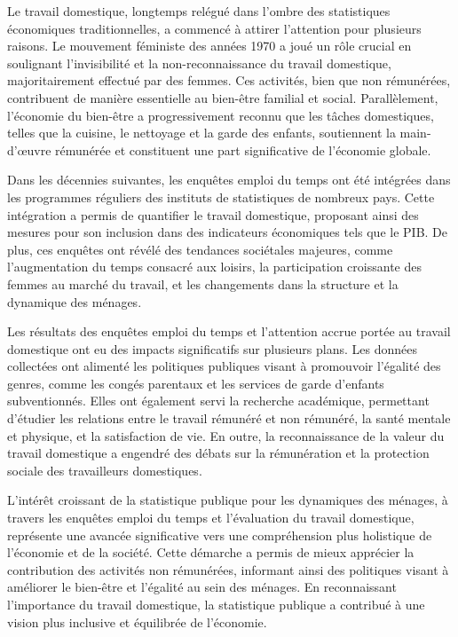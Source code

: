 \documentclass[
  12pt,
]{book}
\begin{document}
Le travail domestique, longtemps relégué dans l'ombre des statistiques
économiques traditionnelles, a commencé à attirer l'attention pour
plusieurs raisons. Le mouvement féministe des années 1970 a joué un rôle
crucial en soulignant l'invisibilité et la non-reconnaissance du travail
domestique, majoritairement effectué par des femmes. Ces activités, bien
que non rémunérées, contribuent de manière essentielle au bien-être
familial et social. Parallèlement, l'économie du bien-être a
progressivement reconnu que les tâches domestiques, telles que la
cuisine, le nettoyage et la garde des enfants, soutiennent la
main-d'œuvre rémunérée et constituent une part significative de
l'économie globale.

Dans les décennies suivantes, les enquêtes emploi du temps ont été
intégrées dans les programmes réguliers des instituts de statistiques de
nombreux pays. Cette intégration a permis de quantifier le travail
domestique, proposant ainsi des mesures pour son inclusion dans des
indicateurs économiques tels que le PIB. De plus, ces enquêtes ont
révélé des tendances sociétales majeures, comme l'augmentation du temps
consacré aux loisirs, la participation croissante des femmes au marché
du travail, et les changements dans la structure et la dynamique des
ménages.

Les résultats des enquêtes emploi du temps et l'attention accrue portée
au travail domestique ont eu des impacts significatifs sur plusieurs
plans. Les données collectées ont alimenté les politiques publiques
visant à promouvoir l'égalité des genres, comme les congés parentaux et
les services de garde d'enfants subventionnés. Elles ont également servi
la recherche académique, permettant d'étudier les relations entre le
travail rémunéré et non rémunéré, la santé mentale et physique, et la
satisfaction de vie. En outre, la reconnaissance de la valeur du travail
domestique a engendré des débats sur la rémunération et la protection
sociale des travailleurs domestiques.

L'intérêt croissant de la statistique publique pour les dynamiques des
ménages, à travers les enquêtes emploi du temps et l'évaluation du
travail domestique, représente une avancée significative vers une
compréhension plus holistique de l'économie et de la société. Cette
démarche a permis de mieux apprécier la contribution des activités non
rémunérées, informant ainsi des politiques visant à améliorer le
bien-être et l'égalité au sein des ménages. En reconnaissant
l'importance du travail domestique, la statistique publique a contribué
à une vision plus inclusive et équilibrée de l'économie.
\end{document}
